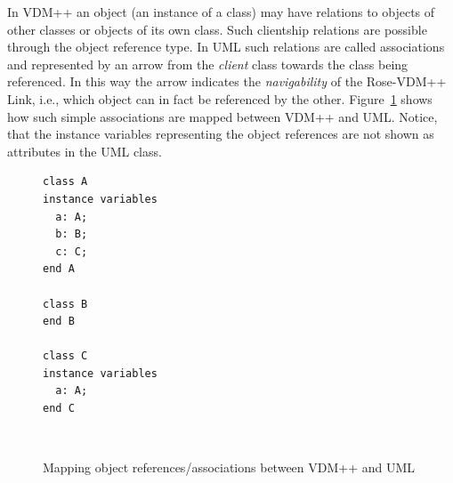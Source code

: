 \documentclass[\pformat,12pt]{article}
\newcommand{\vdmpp}{VDM++}
\newcommand{\link}{Rose-\vdmpp{} Link}
\begin{document}
In \vdmpp{} an object (an instance of a class) may have relations to
objects of other classes or objects of its own class. Such clientship
relations are possible through the object reference type. In UML such
relations are called associations and represented by an arrow from the
{\it client} class towards the class being referenced. In this way the
arrow indicates the {\it navigability} of the \link{}, i.e., which
object can in fact be referenced by the other. Figure~\ref{fig:classA}
shows how such simple associations are mapped between \vdmpp{} and
UML. Notice, that the instance variables representing the object
references are not shown as attributes in the UML class.

\begin{figure}[htb]
\begin{center}
\hspace{-2cm}
\begin{minipage}[t]{2in}
\begin{verbatim}
class A  
instance variables  
  a: A;  
  b: B;  
  c: C;  
end A  
  
class B  
end B  
  
class C  
instance variables  
  a: A;  
end C  
\end{verbatim}
\end{minipage} \ \
\begin{minipage}[t]{2in}
\vspace{1cm}
\end{minipage}
\caption{Mapping object references/associations between \vdmpp{} and UML\label{fig:classA}}
\end{center}
\end{figure}


\renewcommand{\textfraction}{0}
                              

\renewcommand{\topfraction}{1}
                              

\setcounter{totalnumber}{100} 
\setcounter{topnumber}{100} 
   
\end{document}
